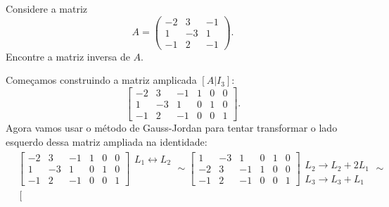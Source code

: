 \begin{exemplo}
    Considere a matriz
    \[
        A = \begin{pmatrix}
            -2 & 3 & -1\\
            1 & -3 & 1\\
            -1 & 2 & -1
        \end{pmatrix}.
    \]
    Encontre a matriz inversa de $A$.
    \begin{solucao}
        Começamos construindo a matriz amplicada $[A|I_3]$:
        \[
            \left[\begin{array}{ccc|ccc}
            -2 & 3 & -1 & 1 & 0 & 0\\
            1 & -3 & 1 & 0 & 1 & 0\\
            -1 & 2 & -1 & 0 & 0 & 1
        \end{array}\right].
        \]  
        Agora vamos usar o método de Gauss-Jordan para tentar transformar o  lado esquerdo dessa matriz ampliada na identidade:
        \begin{align*}
            &\left[
                \begin{array}{ccc|ccc}
                    -2 & 3 & -1 & 1 & 0 & 0\\
                    1 & -3 & 1 & 0 & 1 & 0\\
                    -1 & 2 & -1 & 0 & 0 & 1
                \end{array}
            \right]
            \begin{array}{l}
                L_1 \leftrightarrow L_2\\\phantom{x}\\\phantom{x}
            \end{array}\sim
            \left[
                \begin{array}{ccc|ccc}
                    1 & -3 & 1 & 0 & 1 & 0\\
                    -2 & 3 & -1 & 1 & 0 & 0\\
                    -1 & 2 & -1 & 0 & 0 & 1
                \end{array}
            \right]
            \begin{array}{l}
                \phantom{x}\\L_2 \to L_2 + 2L_1\\L_3 \to L_3 + L_1
            \end{array}\sim\\
            &\left[
                \begin{array}{ccc|ccc}

\end{array}
\end{align*}
\end{solucao}
\end{exemplo}
